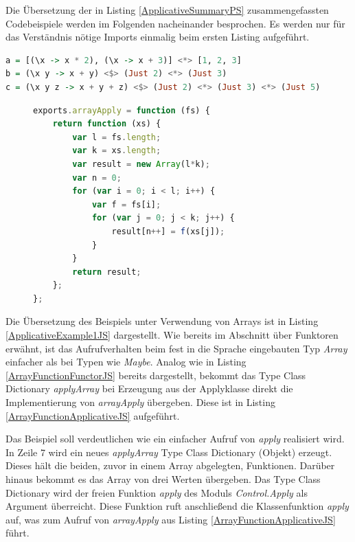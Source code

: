\documentclass[
12pt,
ngerman,
oneside]
{scrbook} %
\begin{document}
Die Übersetzung der in Listing \ref{ApplicativeSummaryPS} zusammengefassten Codebeispiele werden im Folgenden nacheinander besprochen. Es werden nur für das Verständnis nötige Imports einmalig beim ersten Listing aufgeführt.

\begin{lstlisting}[language=purescript, style=numbered-and-boxed, caption=Applicatives in PS, label=ApplicativeSummaryPS]
a = [(\x -> x * 2), (\x -> x + 3)] <*> [1, 2, 3]
b = (\x y -> x + y) <$> (Just 2) <*> (Just 3)
c = (\x y z -> x + y + z) <$> (Just 2) <*> (Just 3) <*> (Just 5)
\end{lstlisting}

\begin{figure}
 \begin{lstlisting}[aboveskip=-1em, language=javascript, caption=Auszug Control.Apply, label=ArrayFunctionApplicativeJS]
exports.arrayApply = function (fs) {
	return function (xs) {
		var l = fs.length;
		var k = xs.length;
		var result = new Array(l*k);
		var n = 0;
		for (var i = 0; i < l; i++) {
			var f = fs[i];
			for (var j = 0; j < k; j++) {
				result[n++] = f(xs[j]);
			}
		}
		return result;
	};
};
\end{lstlisting}
\end{figure}

Die Übersetzung des Beispiels unter Verwendung von Arrays ist in Listing \ref{ApplicativeExample1JS} dargestellt. Wie bereits im Abschnitt über Funktoren erwähnt, ist das Aufrufverhalten beim fest in die Sprache eingebauten Typ \emph{Array} einfacher als bei Typen wie \emph{Maybe}. Analog wie in Listing \ref{ArrayFunctionFunctorJS} bereits dargestellt, bekommt das Type Class Dictionary \emph{applyArray} bei Erzeugung aus der Applyklasse direkt die Implementierung von \emph{arrayApply}  übergeben. Diese ist in Listing \ref{ArrayFunctionApplicativeJS} aufgeführt.

Das Beispiel soll verdeutlichen wie ein einfacher Aufruf von \emph{apply} realisiert wird. In Zeile 7 wird ein neues  \emph{applyArray} Type Class Dictionary (Objekt) erzeugt. Dieses hält die beiden, zuvor in einem Array abgelegten, Funktionen. Darüber hinaus bekommt es das Array von drei Werten übergeben. Das Type Class Dictionary wird der freien Funktion \emph{apply} des Moduls \emph{Control.Apply} als Argument überreicht. Diese Funktion ruft anschließend die Klassenfunktion \emph{apply} auf, was zum Aufruf von \emph{arrayApply} aus Listing \ref{ArrayFunctionApplicativeJS} führt.
\end{document}
